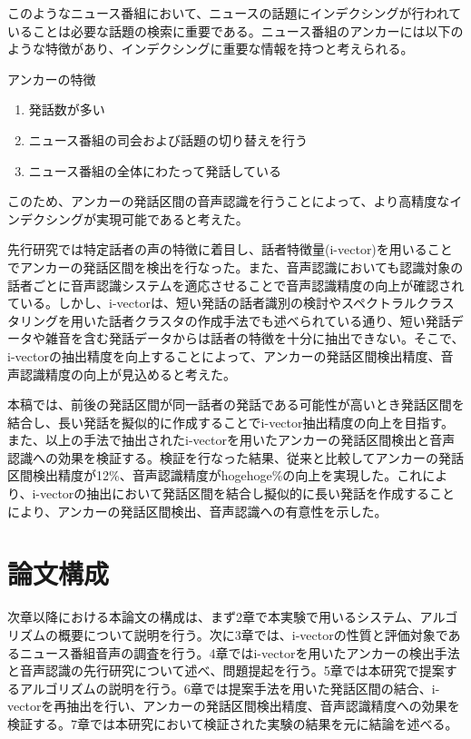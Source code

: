 このようなニュース番組において、ニュースの話題にインデクシングが行われていることは必要な話題の検索に重要である。ニュース番組のアンカーには以下のような特徴があり、インデクシングに重要な情報を持つと考えられる。\newline

アンカーの特徴
\begin{enumerate}
\item 発話数が多い
\item ニュース番組の司会および話題の切り替えを行う
\item ニュース番組の全体にわたって発話している
\end{enumerate}\par

このため、アンカーの発話区間の音声認識を行うことによって、より高精度なインデクシングが実現可能であると考えた。\par
先行研究では特定話者の声の特徴に着目し、話者特徴量(i-vector)を用いることでアンカーの発話区間を検出を行なった。また、音声認識においても認識対象の話者ごとに音声認識システムを適応させることで音声認識精度の向上が確認されている。しかし、i-vectorは、短い発話の話者識別の検討\cite{panaiv}やスペクトラルクラスタリングを用いた話者クラスタの作成手法\cite{spectroclus}でも述べられている通り、短い発話データや雑音を含む発話データからは話者の特徴を十分に抽出できない。そこで、i-vectorの抽出精度を向上することによって、アンカーの発話区間検出精度、音声認識精度の向上が見込めると考えた。\par
本稿では、前後の発話区間が同一話者の発話である可能性が高いとき発話区間を結合し、長い発話を擬似的に作成することでi-vector抽出精度の向上を目指す。また、以上の手法で抽出されたi-vectorを用いたアンカーの発話区間検出と音声認識への効果を検証する。検証を行なった結果、従来と比較してアンカーの発話区間検出精度が12\%、音声認識精度がhogehoge\%の向上を実現した。これにより、i-vectorの抽出において発話区間を結合し擬似的に長い発話を作成することにより、アンカーの発話区間検出、音声認識への有意性を示した。

\section{論文構成}
次章以降における本論文の構成は、まず2章で本実験で用いるシステム、アルゴリズムの概要について説明を行う。次に3章では、i-vectorの性質と評価対象であるニュース番組音声の調査を行う。4章ではi-vectorを用いたアンカーの検出手法と音声認識の先行研究について述べ、問題提起を行う。5章では本研究で提案するアルゴリズムの説明を行う。6章では提案手法を用いた発話区間の結合、i-vectorを再抽出を行い、アンカーの発話区間検出精度、音声認識精度への効果を検証する。7章では本研究において検証された実験の結果を元に結論を述べる。

